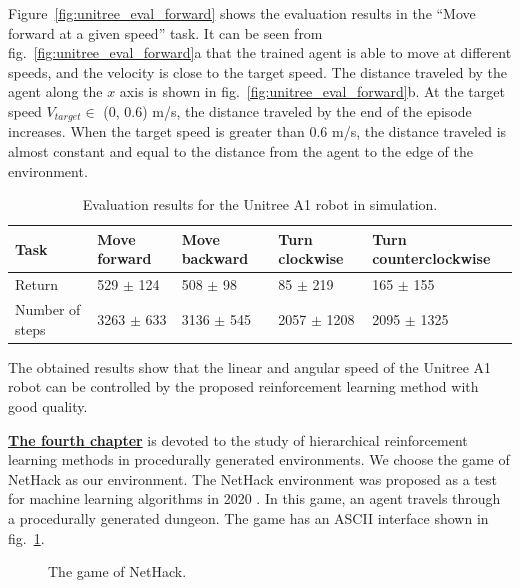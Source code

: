 Figure~\ref{fig:unitree_eval_forward} shows the evaluation results in the ``Move forward at a given speed'' task. It can be seen from fig.~\ref{fig:unitree_eval_forward}a that the trained agent is able to move at different speeds, and the velocity is close to the target speed. The distance traveled by the agent along the $x$ axis is shown in fig.~\ref{fig:unitree_eval_forward}b. At the target speed $V_{target} \in$ (0, 0.6) m/s, the distance traveled by the end of the episode increases. When the target speed is greater than 0.6 m/s, the distance traveled is almost constant and equal to the distance from the agent to the edge of the environment.

\begin{table} [htbp]
    \centering
    \begin{threeparttable}
        \caption{Evaluation results for the Unitree A1 robot in simulation.}\label{tab:unitree_eval}
        \begin{tabular}{| p{2cm} || p{2cm} | p{2cm} | p{2cm} |p{2.5cm} |}
            \hline
            \hline
            Task & Move forward & Move backward & Turn clockwise & Turn counterclockwise \\
            \hline
            Return &	529 $\pm$ 124 &	508 $\pm$ 98 &	85 $\pm$ 219 &	165 $\pm$ 155 \\
            Number of steps & 3263 $\pm$ 633 &	3136 $\pm$ 545 &	2057 $\pm$ 1208 &	2095 $\pm$ 1325 \\
            \hline
            \hline
        \end{tabular}
    \end{threeparttable}
\end{table}

The obtained results show that the linear and angular speed of the Unitree A1 robot can be controlled by the proposed reinforcement learning method with good quality.

\underline{\textbf{The fourth chapter}} is devoted to the study of hierarchical reinforcement learning methods in procedurally generated environments. We choose the game of NetHack as our environment. The NetHack environment was proposed as a test for machine learning algorithms in 2020 \cite{nethack}. In this game, an agent travels through a procedurally generated dungeon. The game has an ASCII interface shown in fig.~\ref{fig:nethack}.

\begin{figure}[ht]
    \caption{The game of NetHack.}\label{fig:nethack}
\end{figure}

